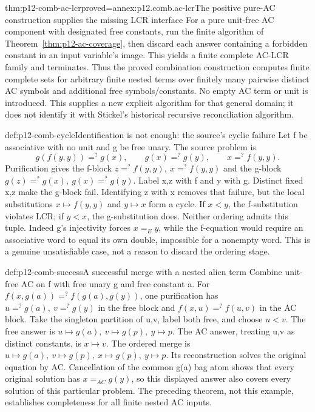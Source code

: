 \begin{hbtheorem}{thm:p12-comb-ac-lcr}{proved=annex:p12.comb.ac-lcr}{The positive pure-AC construction supplies the missing LCR interface}
For a pure unit-free AC component with designated free constants,
run the finite algorithm of Theorem~\ref{thm:p12-ac-coverage}, then
discard each answer containing a forbidden constant in an input
variable's image. This yields a finite complete AC-LCR family and
terminates. Thus the proved combination construction computes finite
complete sets for arbitrary finite nested terms over finitely many
pairwise distinct AC symbols and additional free symbols/constants.
No empty AC term or unit is introduced. This supplies a new explicit
algorithm for that general domain; it does not identify it with
Stickel's historical recursive reconciliation algorithm.
\end{hbtheorem}

\begin{hbexample}{def:p12-comb-cycle}{Identification is not enough: the source's cyclic failure}
Let f be associative with no unit and g be free unary. The source
problem is
\[
g(f(y,y))=^{?}g(x),\qquad g(x)=^{?}g(y),\qquad x=^{?}f(y,y).
\]
Purification gives the f-block \(z=^{?}f(y,y),\ x=^{?}f(y,y)\)
and the g-block \(g(z)=^{?}g(x),\ g(x)=^{?}g(y)\).
Label x,z with f and y with g. Distinct fixed x,z make the g-block fail.
Identifying z with x removes that failure, but the local substitutions
\(x\mapsto f(y,y)\) and \(y\mapsto x\) form a cycle. If \(x<y\),
the f-substitution violates LCR; if \(y<x\), the g-substitution does.
Neither ordering admits this tuple. Indeed g's injectivity forces
\(x=_Ey\), while the f-equation would require an associative word to
equal its own double, impossible for a nonempty word. This is a genuine
unsatisfiable case, not a reason to discard the ordering stage.
\cite[pp.~514--515]{BaaderSnyder2001}
\end{hbexample}

\begin{hbexample}{def:p12-comb-success}{A successful merge with a nested alien term}
Combine unit-free AC on f with free unary g and free constant a.
For \(f(x,g(a))=^{?}f(g(a),g(y))\), one purification has
\(u=^{?}g(a),\ v=^{?}g(y)\) in the free block and
\(f(x,u)=^{?}f(u,v)\) in the AC block. Take the singleton partition
of u,v, label both free, and choose \(u<v\). The free answer is
\(u\mapsto g(a),\ v\mapsto g(p),\ y\mapsto p\).
The AC answer, treating u,v as distinct constants, is \(x\mapsto v\).
The ordered merge is
\(u\mapsto g(a),\ v\mapsto g(p),\ x\mapsto g(p),\ y\mapsto p\).
Its reconstruction solves the original equation by AC. Cancellation
of the common g(a) bag atom shows that every original solution has
\(x=_{AC}g(y)\), so this displayed answer also covers every solution
of this particular problem. The preceding theorem, not this example,
establishes completeness for all finite nested AC inputs.
\end{hbexample}

